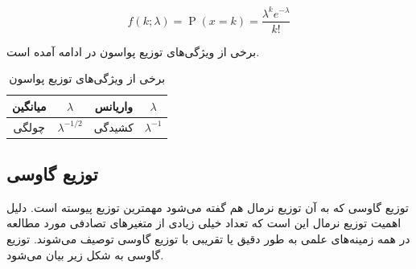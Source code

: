 \begin{equation}
    f(k ; \lambda)=\operatorname{P}(x=k)=\frac{\lambda^{k} e^{-\lambda}}{k !}
\end{equation}

برخی از ویژگی‌های توزیع پواسون در ادامه آمده است.
\bgroup
\def\arraystretch{1.5}
\begin{table}[htb]
    \centering
    \caption{برخی از ویژگی‌های توزیع پواسون}
    \begin{tabular}{ c c | c c}
    \hline
     میانگین & $\lambda$ & واریانس & $\lambda$ \\ \hline
     چولگی & $\lambda^{-1/2}$ & کشیدگی & $\lambda^{-1}$ \\ \hline
    \end{tabular}
\end{table}
\egroup
\FloatBarrier

\subsection{توزیع گاوسی}

توزیع گاوسی که به آن توزیع نرمال هم گفته می‌شود مهمترین توزیع پیوسته است. دلیل اهمیت توزیع نرمال این است که تعداد خیلی زیادی از متغیرهای تصادفی مورد مطالعه در همه زمینه‌های  علمی به طور دقیق یا تقریبی با توزیع گاوسی توصیف می‌شوند. توزیع گاوسی به شکل زیر بیان می‌شود.

